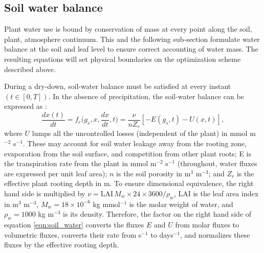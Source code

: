 \documentclass[utf8]{frontiersSCNS} %
\begin{document}
\subsection{Soil water balance}

Plant water use is bound by conservation of mass at every point along the soil, plant, atmosphere continuum. This and the following sub-section formulate water balance at the soil and leaf level to ensure correct accounting of water mass. The resulting equations will set physical boundaries on the optimization scheme described above.

During a dry-down, soil-water balance must be satisfied at every instant $(t \in [0,T])$. In the absence of precipitation, the soil-water balance can be expressed as \citep{rodriguez-iturbe_ecohydrology_2007}:
\begin{equation}
    \label{eqn:soil_water}
    \frac{dx(t)}{dt} = f_e\Big(g_s, x, \frac{dx}{dt}, t\Big) = \frac{\nu}{ n Z_r}[- E(g_s, t) - U(x, t)],
\end{equation}
where $U$ lumps all the uncontrolled losses (independent of the plant) in mmol m$^{-2}$ s$^{-1}$. These may account for soil water leakage away from the rooting zone, evaporation from the soil surface, and competition from other plant roots; E is the transpiration rate from the plant in mmol m$^{-2}$ s$^{-1}$ (throughout, water fluxes are expressed per unit leaf area);  $n$ is the soil porosity in m$^3$ m$^{-3}$; and $Z_r$ is the effective plant rooting depth in m. To ensure dimensional equivalence, the right hand side is multiplied by $\nu = \text{LAI} \, M_w \times 24 \times 3600 / \rho_w$, LAI is the leaf area index in m$^3$ m$^{-3}$, $M_w = 18 \times 10^{-6}$ kg mmol$^{-1}$ is the molar weight of water, and $\rho_w = 1000$ kg m$^{-3}$ is its density. Therefore, the factor on the right hand side of equation \ref{eqn:soil_water} converts the fluxes $E$ and $U$ from molar fluxes to volumetric fluxes, converts their rate from s$^{-1}$ to days${^{-1}}$, and normalizes these fluxes by the effective rooting depth.
\end{document}

